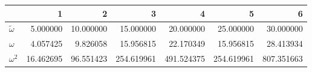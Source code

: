\begin{tabular}{lrrrrrr}
\toprule
{} &          1 &          2 &           3 &           4 &           5 &           6 \\
\midrule
$\tilde \omega$ &   5.000000 &  10.000000 &   15.000000 &   20.000000 &   25.000000 &   30.000000 \\
$\omega$        &   4.057425 &   9.826058 &   15.956815 &   22.170349 &   15.956815 &   28.413934 \\
$\omega^2$      &  16.462695 &  96.551423 &  254.619961 &  491.524375 &  254.619961 &  807.351663 \\
\bottomrule
\end{tabular}
